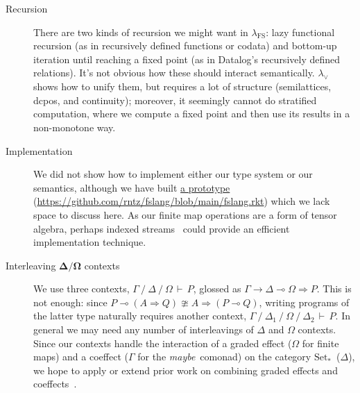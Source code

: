 \documentclass[runningheads]{llncs}
\newcommand\strong[1]{{\bfseries#1}}
\newcommand\todo[1]{{\color{IndianRed}#1}}
\newcommand\xxx{\text{\todo{\strong{XXX}}}}
\renewcommand\todo[1]{\ignorespaces}\renewcommand\xxx{\text{\color{IndianRed}\strong{XXX}}}
\newcommand\fslang{\ensuremath{\lambda_{\mathrm{FS}}}}
\newcommand\catname[1]{\ensuremath{\mathrm{#1}}}
\newcommand\Point{\ensuremath{\catname{Set}_{*}}}
\newcommand\<\:                 %
\newcommand\lto\multimap        %
\newcommand\fto\Rightarrow
\newcommand\typename\textit
\newcommand\maybe{\typename{maybe}}
\newcommand\G{\mathrm{\Gamma}}
\newcommand\D{\mathrm{\Delta}}
\renewcommand\O{\mathrm{\Omega}}
\newcommand\cxsep{\mathbin{/}}
\newcommand\entails{\,\vdash\,}
\renewcommand\G\Gamma
\renewcommand\D\Delta
\renewcommand\O\Omega
\begin{document}
\begin{description}
\item[Recursion]
  There are two kinds of recursion we might want in \fslang:
  lazy functional recursion (as in recursively defined functions or codata) and bottom-up iteration until reaching a fixed point (as in Datalog's recursively defined relations).
  It's not obvious how these should interact semantically. $\lambda_\vee$~\cite{DBLP:journals/pacmpl/RiouxZ25} shows how to unify them, but requires a lot of structure (semilattices, dcpos, and continuity); moreover, it seemingly cannot do stratified computation, where we compute a fixed point and then use its results in a non-monotone way.


\item[Implementation]
  We did not show how to implement either our type system or our semantics, although
  we have built \href{https://github.com/rntz/fslang/blob/b2730369f68f1cdb4fd69b4a8d997b167d29b7a0/fslang.rkt}{a prototype} (\url{https://github.com/rntz/fslang/blob/main/fslang.rkt}) which we lack space to discuss here.
  As our finite map operations are a form of tensor algebra, perhaps indexed streams~\cite{10.1145/3591268} could provide an efficient implementation technique.

\item[Interleaving $\boldsymbol\D/\boldsymbol\O$ contexts]
  We use three contexts, $\G \cxsep \D \cxsep \O \entails P$, glossed as $\G \to \D \lto \O \fto P$.
  This is not enough: since $P \lto (A \fto Q) \ncong A \fto (P \lto Q)$, writing programs of the latter type naturally requires another context, $\G \cxsep \D_1 \cxsep \O \cxsep \D_2 \entails P$.
  In general we may need any number of interleavings of $\D$ and $\O$ contexts.
  Since our contexts %
  handle the interaction of a graded effect ($\O$ for finite maps) and a coeffect ($\G$ for the \maybe\ comonad) on the category \Point\ ($\D$),
  we hope to apply or extend prior work on combining graded effects and coeffects~\cite{10.1145/2951913.2951939}.


\end{description}
\end{document}
